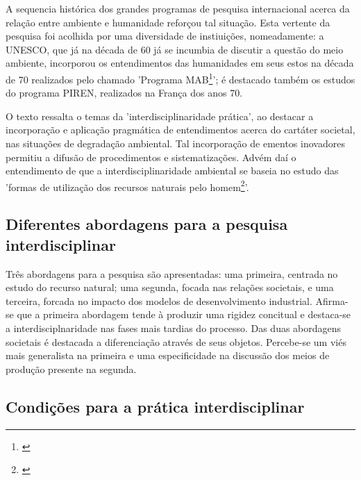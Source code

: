 \documentclass[
   article,       %
   12pt,          %
   oneside,       %
   a4paper,       %
   english,       %
   brazil,           %
   sumario=tradicional
   ]{abntex2}
\begin{document}
A sequencia histórica dos grandes programas de pesquisa internacional acerca da relação entre ambiente e humanidade reforçou tal situação. Esta vertente da pesquisa foi acolhida por uma diversidade de instiuições, nomeadamente: a UNESCO, que já na década de 60 já se incumbia de discutir a questão do meio ambiente, incorporou os entendimentos das humanidades em seus estos na década de 70 realizados pelo chamado 'Programa MAB\footnote{\cite[p.111]{Interdisciplinares_Consolidados}}'; é destacado também os estudos do programa PIREN, realizados na França dos anos 70. 

O texto ressalta o temas da 'interdisciplinaridade prática', ao destacar a incorporação e aplicação pragmática de entendimentos acerca do cartáter societal, nas situações de degradação ambiental. Tal incorporação de ementos inovadores permitiu a difusão de procedimentos e sistematizações. Advém daí o entendimento de que a interdisciplinaridade ambiental se baseia no estudo das 'formas de utilização dos recursos naturais pelo homem\footnote{\cite[p.113]{Interdisciplinares_Consolidados}}'.



\subsection{Diferentes abordagens para a pesquisa interdisciplinar}

Três abordagens para a pesquisa são apresentadas: uma primeira, centrada no estudo do recurso natural; uma segunda, focada nas relações societais, e uma terceira, forcada no impacto dos modelos de desenvolvimento industrial. Afirma-se que a primeira abordagem tende à produzir uma rigidez concitual e destaca-se a interdisciplnaridade nas fases mais tardias do processo. Das duas abordagens societais é destacada a diferenciação através de seus objetos. Percebe-se um viés mais generalista na primeira e uma especificidade na discussão dos meios de produção presente na segunda.


\subsection{Condições para a prática interdisciplinar}
\end{document}
